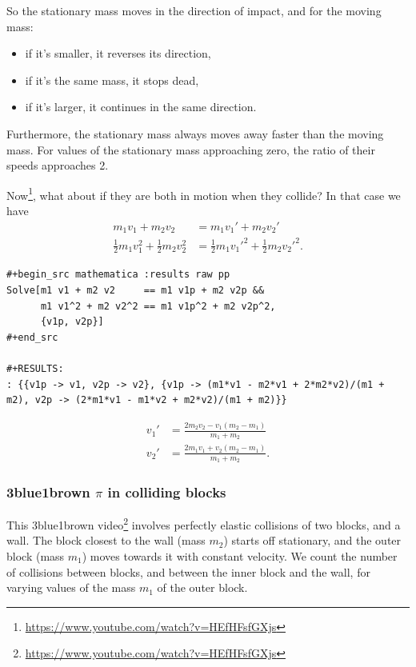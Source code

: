 So the stationary mass moves in the direction of impact, and for the moving mass:
\begin{itemize}
\item if it's smaller, it reverses its direction,
\item if it's the same mass, it stops dead,
\item if it's larger, it continues in the same direction.
\end{itemize}
Furthermore, the stationary mass always moves away faster than the moving mass. For values of the
stationary mass approaching zero, the ratio of their speeds approaches 2.


Now\footnote{\url{https://www.youtube.com/watch?v=HEfHFsfGXjs}}, what about if they are both in
motion when they collide? In that case we have
\begin{align}
  m_1v_1 + m_2v_2                           &= m_1v_1' + m_2v_2' \\
  \frac{1}{2}m_1v_1^2 + \frac{1}{2}m_2v_2^2 &= \frac{1}{2}m_1v_1'^2 + \frac{1}{2}m_2v_2'^2.
\end{align}
\begin{verbatim}
#+begin_src mathematica :results raw pp
Solve[m1 v1 + m2 v2     == m1 v1p + m2 v2p &&
      m1 v1^2 + m2 v2^2 == m1 v1p^2 + m2 v2p^2,
      {v1p, v2p}]
#+end_src

#+RESULTS:
: {{v1p -> v1, v2p -> v2}, {v1p -> (m1*v1 - m2*v1 + 2*m2*v2)/(m1 + m2), v2p -> (2*m1*v1 - m1*v2 + m2*v2)/(m1 + m2)}}
\end{verbatim}
\begin{align*}
  v_1' &= \frac{2m_2v_2 - v_1(m_2 - m_1)}{m_1 + m_2} \\
  v_2' &= \frac{2m_1v_1 + v_2(m_2 - m_1)}{m_1 + m_2}.
\end{align*}

\newpage
\subsubsection{3blue1brown $\pi$ in colliding blocks}

This 3blue1brown video\footnote{\url{https://www.youtube.com/watch?v=HEfHFsfGXjs}} involves
perfectly elastic collisions of two blocks, and a wall. The block closest to the wall (mass $m_2$)
starts off stationary, and the outer block (mass $m_1$) moves towards it with constant velocity. We
count the number of collisions between blocks, and between the inner block and the wall, for varying
values of the mass $m_1$ of the outer block.

